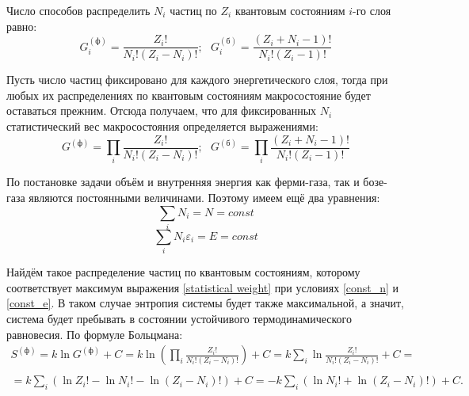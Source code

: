 \documentclass[A4]{article}
\begin{document}
    Число способов распределить $N_i$ частиц по $Z_i$ квантовым состояниям $i$-го слоя равно:
    \begin{equation*}
        G_i^{(\text{ф})} = \frac{Z_i!}{N_i!(Z_i - N_i)!};\ \ \ G_i^{(\text{б})} = \frac{(Z_i + N_i - 1)!}{N_i!(Z_i - 1)!}
    \end{equation*}

    Пусть число частиц фиксировано для каждого энергетического слоя, тогда при любых их распределениях
    по квантовым состояниям макросостояние будет оставаться прежним. Отсюда получаем, что для
    фиксированных $N_i$ статистический вес макросостояния определяется выражениями:
    \begin{equation}\label{statistical weight}
        G^{(\text{ф})} = \prod\limits_{i}\frac{Z_i!}{N_i!(Z_i - N_i)!};\ \ \
        G^{(\text{б})} = \prod\limits_{i}\frac{(Z_i + N_i - 1)!}{N_i!(Z_i - 1)!}
    \end{equation}

    По постановке задачи объём и внутренняя энергия как ферми-газа, так и бозе-газа являются постоянными
    величинами. Поэтому имеем ещё два уравнения:
    \begin{equation}\label{const_n}
        \sum\limits_{i} N_i = N = const
    \end{equation}
    \begin{equation}\label{const_e}
        \sum\limits_{i} N_i\varepsilon_i = E = const
    \end{equation}

    Найдём такое распределение частиц по квантовым состояниям, которому соответствует максимум
    выражения \eqref{statistical weight} при условиях \eqref{const_n} и \eqref{const_e}. В таком
    случае энтропия системы будет также максимальной, а значит, система будет пребывать в состоянии
    устойчивого термодинамического равновесия. По формуле Больцмана:
    \begin{equation}\label{FD_1}
        \begin{split}
            S^{(\text{ф})} = k\ln{G^{(\text{ф})}} + C =
            k\ln{\left(\prod\limits_{i}\frac{Z_i!}{N_i!(Z_i - N_i)!}\right)} + C =
            k\sum\limits_{i} \ln{\frac{Z_i!}{N_i!(Z_i - N_i)!}} + C = \\\\
            = k\sum\limits_{i}(\ln{Z_i!} - \ln{N_i!} - \ln{(Z_i - N_i)!}) + C =
            -k\sum\limits_{i}(\ln{N_i!} + \ln{(Z_i - N_i)!}) + C.
        \end{split}
    \end{equation}
\end{document}
